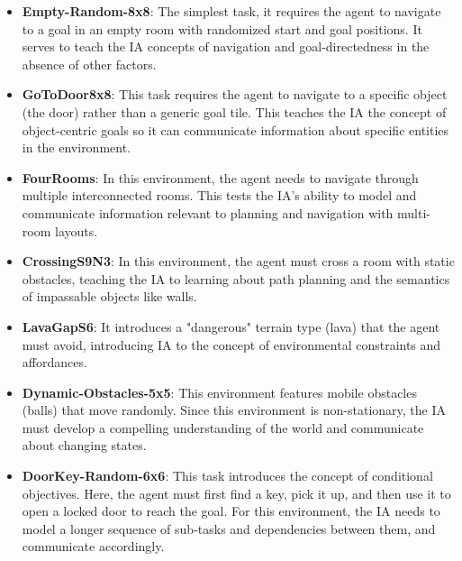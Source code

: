 \documentclass[letterpaper]{article} %
\begin{document}
\begin{appendix}
\begin{itemize}
    \item \textbf{Empty-Random-8x8}: The simplest task, it requires the agent to navigate to a goal in an empty room with randomized start and goal positions. It serves to teach the IA concepts of navigation and goal-directedness in the absence of other factors.
    \item \textbf{GoToDoor8x8}: This task requires the agent to navigate to a specific object (the door) rather than a generic goal tile. This teaches the IA the concept of object-centric goals so it can communicate information about specific entities in the environment.
    \item \textbf{FourRooms}: In this environment, the agent needs to navigate through multiple interconnected rooms. This tests the IA's ability to model and communicate information relevant to planning and navigation with multi-room layouts.
    \item \textbf{CrossingS9N3}: In this environment, the agent must cross a room with static obstacles, teaching the IA to learning about path planning and the semantics of impassable objects like walls.
    \item \textbf{LavaGapS6}: It introduces a "dangerous" terrain type (lava) that the agent must avoid, introducing IA to the concept of environmental constraints and affordances.
    \item \textbf{Dynamic-Obstacles-5x5}: This environment features mobile obstacles (balls) that move randomly. Since this environment is non-stationary, the IA must develop a compelling understanding of the world and communicate about changing states.
    \item \textbf{DoorKey-Random-6x6}: This task introduces the concept of conditional objectives. Here, the agent must first find a key, pick it up, and then use it to open a locked door to reach the goal. For this environment, the IA needs to model a longer sequence of sub-tasks and dependencies between them, and communicate accordingly. 
\end{itemize}


\end{appendix}
\end{document}
